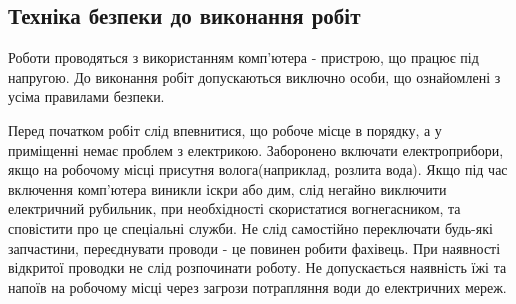 \subsection{Техніка безпеки до виконання робіт}

    Роботи проводяться з використанням комп'ютера - пристрою, що працює під напругою. До виконання робіт допускаються виключно особи, що ознайомлені з усіма правилами безпеки.
    
    Перед початком робіт слід впевнитися, що робоче місце в порядку, а у приміщенні немає проблем з електрикою.
    Заборонено включати електроприбори, якщо на робочому місці присутня волога(наприклад, розлита вода).
    Якщо під час включення комп'ютера виникли іскри або дим, слід негайно виключити електричний рубильник,
    при необхідності скористатися вогнегасником, та сповістити про це спеціальні служби.
    Не слід самостійно переключати будь-які запчастини, переєднувати проводи - це повинен робити фахівець.
    При наявності відкритої проводки не слід розпочинати роботу.
    Не допускається наявність їжі та напоїв на робочому місці через загрози потрапляння води до електричних мереж.
